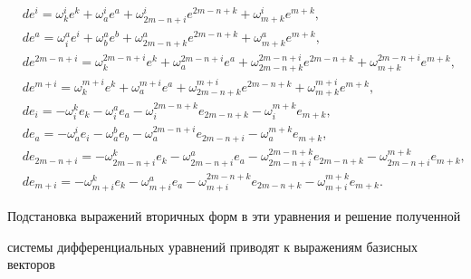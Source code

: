 \begin{align*}


&de^i=\omega^i_ke^k+\omega^i_ae^a+\omega^i_{2m-n+i}e^{2m-


n+k}+\omega^i_{m+k}e^{m+k},\\


%


&de^a=\omega^a_ie^i+\omega^a_be^b+\omega^a_{2m-n+k}e^{2m-


n+k}+\omega^a_{m+k}e^{m+k},\\


%


&de^{2m-n+i}=\omega^{2m-n+i}_ke^k+\omega^{2m-n+i}_ae^a+\omega^{2m-


n+i}_{2m-n+k}e^{2m-n+k}+ \omega^{2m-n+i}_{m+k}e^{m+k},\\


%


&de^{m+i}=\omega^{m+i}_ke^k+\omega^{m+i}_ae^a+\omega^{m+i}_{2m-n+k}e^{2m-


n+k}+ \omega^{m+i}_{m+k} e^{m+k},\\


%


&de_i=- \omega^k_ie_k - \omega^a_ie_a - \omega^{2m-n+k}_ie_{2m-n+k}-


\omega^{m+k}_i e_{m+k},\\


%


&de_a=- \omega^i_ae_i-\omega^b_a e_b-\omega^{2m-n+i}_a e_{2m-n+i}-


\omega^{m+k}_ae_{m+k},\\


%


&de_{2m-n+i}=- \omega^k_{2m-n+i}e_k - \omega^a_{2m-n+i}e_a - \omega^{2m-


n+k}_{2m-n+i}e_{2m-n+k} - \omega^{m+k}_{2m-n+i}e_{m+k},\\


%


&de_{m+i}=- \omega^k_{m+i}e_k - \omega^a_{m+i}e_a - \omega^{2m-


n+k}_{m+i}e_{2m-n+k}-\omega^{m+k}_{m+i}e_{m+k}.


\end{align*}


Подстановка выражений вторичных форм в эти уравнения и решение полученной


системы дифференциальных уравнений приводят к выражениям базисных векторов


